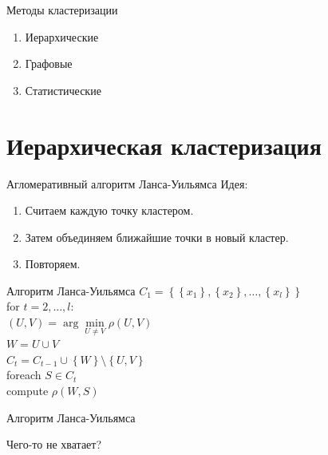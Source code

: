 \documentclass[10pt]{beamer}
\begin{document}
\begin{frame}{Методы кластеризации}
	\begin{enumerate} [-]
		\item Иерархические
		\item Графовые 
		\item Статистические 
	\end{enumerate}
\end{frame}

\section{Иерархическая кластеризация}

\begin{frame}{Агломеративный алгоритм Ланса-Уильямса}
	\alert{Идея}:\\
	\begin{enumerate}
		\item Считаем каждую точку кластером. 
		\item Затем объединяем ближайшие точки в новый кластер. 
		\item Повторяем.
	\end{enumerate}
\end{frame}


\begin{frame}{Алгоритм Ланса-Уильямса}
	${C_1 = \left\{ \left\{ x_1\right\}, \left\{x_2 \right\}, \dots, \left\{x_l \right\} \right\}}$\\
	for ${t=2, \dots, l }$:\\
	\hspace{5mm} ${(U, V) = \arg\min\limits_{U \neq V} \rho(U, V)}$\\
	\hspace{5mm} $W = U \cup V$\\
	\hspace{5mm} ${C_t = C_{t-1} \cup \left\{ W \right\}\setminus \left\{U, V \right\} }$\\
	\hspace{5mm} foreach ${S \in C_t}$\\
	\hspace{10mm}   compute $\rho(W, S)$\\
\end{frame}


\begin{frame}{Алгоритм Ланса-Уильямса}
  \begin{center}
    Чего-то не хватает?  
  \end{center}
\end{frame}
\end{document}
